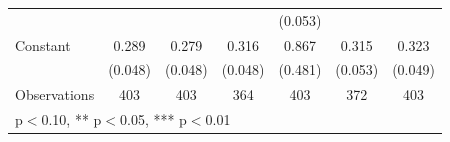 \begin{table}[htbp]
\begin{tabular}{l*{6}{c}}
                    &                     &                     &                     &     (0.053)         &                     &                     \\
\addlinespace
Constant            &       0.289\sym{***}&       0.279\sym{***}&       0.316\sym{***}&       0.867\sym{*}  &       0.315\sym{***}&       0.323\sym{***}\\
                    &     (0.048)         &     (0.048)         &     (0.048)         &     (0.481)         &     (0.053)         &     (0.049)         \\
\midrule
Observations        &         403         &         403         &         364         &         403         &         372         &         403         \\
\bottomrule
\multicolumn{7}{l}{\footnotesize * p$<$0.10, ** p$<$0.05, *** p$<$0.01}\\
\end{tabular}
\end{table}
